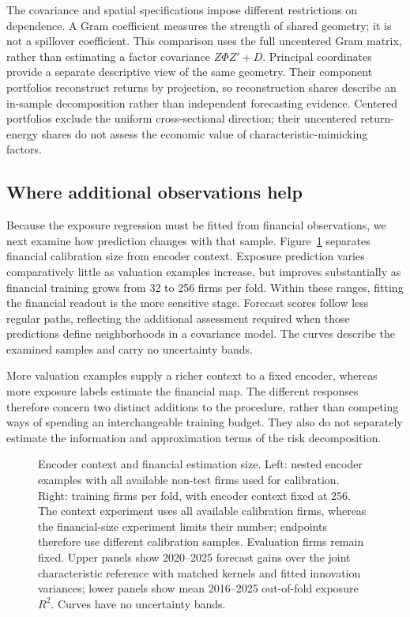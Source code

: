 \documentclass[11pt]{article}
\begin{document}
The covariance and spatial specifications impose different restrictions on
dependence. A Gram coefficient measures the strength of shared geometry;
it is not a spillover coefficient. This comparison uses the full uncentered
Gram matrix, rather than estimating a factor covariance $Z\Phi Z'+D$.
Principal coordinates provide a separate
descriptive view of the same geometry. Their component portfolios reconstruct
returns by projection, so reconstruction shares describe an in-sample
decomposition rather than independent forecasting evidence. Centered portfolios
exclude the uniform cross-sectional direction; their uncentered return-energy
shares do not assess the economic value of characteristic-mimicking factors.

\subsection{Where additional observations help}
Because the exposure regression must be fitted from financial observations,
we next examine how prediction changes with that sample.
Figure~\ref{fig:support} separates financial calibration size from encoder
context. Exposure prediction varies comparatively little as valuation examples
increase, but improves substantially as financial training grows from 32 to 256
firms per fold. Within these ranges, fitting the financial readout is the more
sensitive stage. Forecast scores follow less regular paths, reflecting the
additional assessment required when those predictions define neighborhoods in
a covariance model. The curves describe the examined samples and carry no
uncertainty bands.

More valuation examples supply a richer context to a fixed encoder,
whereas more exposure labels estimate the financial map. The different
responses therefore concern two distinct additions to the procedure, rather
than competing ways of spending an interchangeable training budget. They also
do not separately estimate the information and approximation terms of the risk
decomposition.

\begin{figure}[htbp]
  \centering
  
  \caption{Encoder context and financial estimation size. Left: nested encoder
    examples with all available non-test firms used for calibration. Right:
    training firms per fold, with encoder context fixed at 256. The context
    experiment uses all available calibration firms, whereas the financial-size
    experiment limits their number; endpoints therefore use different
    calibration samples. Evaluation firms remain fixed. Upper panels show
    2020--2025 forecast gains over the joint characteristic reference with
    matched kernels and fitted innovation variances; lower panels show mean
    2016--2025 out-of-fold exposure $R^2$. Curves have no uncertainty
  bands.}\label{fig:support}
\end{figure}
\end{document}
